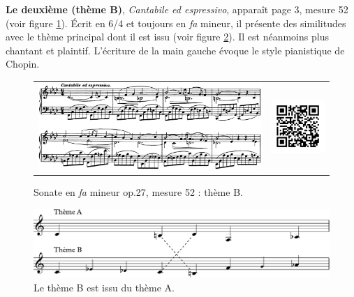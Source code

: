 \textbf{Le deuxième (thème B)}, \emph{Cantabile ed espressivo}, apparaît page 3, mesure 52 (voir figure \ref{sonate-theme-2}). Écrit en 6/4 et toujours en \emph{fa} mineur, il présente des similitudes avec le thème principal dont il est issu (voir figure \ref{sonate-theme-1-vs-2}). Il est néanmoins plus chantant et plaintif. L'écriture de la main gauche évoque le style pianistique de Chopin.

\begin{figure}[!ht]
  \begin{bigcenter}
    \vspace*{0.2cm}
    \begin{tabular}{lr}
      \includegraphics[width=12.5cm, keepaspectratio]{sonate-theme-B.png}
      &
      \includegraphics[width=3cm, keepaspectratio]{op1-qr.png}
    \end{tabular}
  \end{bigcenter}
  \caption{\label{sonate-theme-2}Sonate en \emph{fa} mineur op.27, mesure 52 : thème B.}
\end{figure}

\begin{figure}[!ht]
  \begin{bigcenter}
      \includegraphics[width=12.75cm, keepaspectratio]{sonate-theme-A-vs-B.pdf}\vspace{-0.5cm}
  \end{bigcenter}
  \caption{\label{sonate-theme-1-vs-2}Le thème B est issu du thème A.}
\end{figure}

